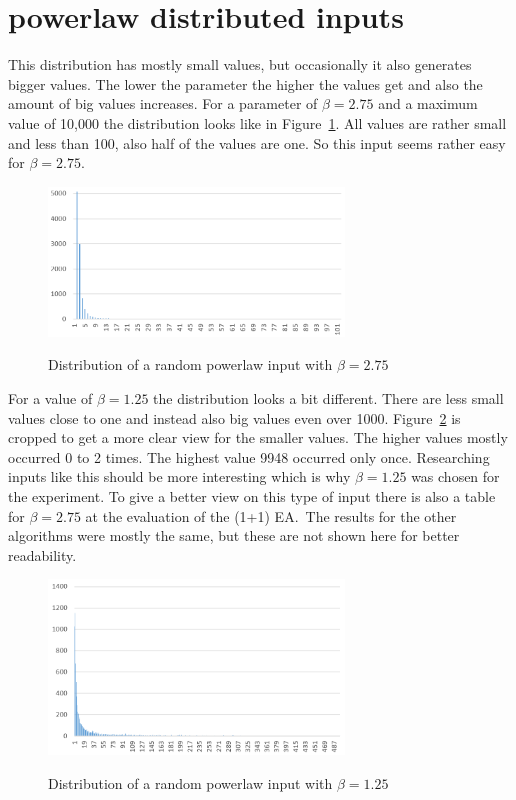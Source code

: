 \section{powerlaw distributed inputs}
This distribution has mostly small values, but occasionally it also generates bigger values.
The lower the parameter the higher the values get and also the amount of big values increases.
For a parameter of $\beta=2.75$ and a maximum value of 10,000 the distribution looks like in Figure~\ref{fig:powerDistExample1}.
All values are rather small and less than 100, also half of the values are one.
So this input seems rather easy for $\beta=2.75$.

\begin{figure}[h]
      \caption{Distribution of a random powerlaw input with $\beta=2.75$}
      \centering
      \includegraphics[width=0.7\textwidth]{figures/images/numberGenerator/powerlaw_-2_75.png}\label{fig:powerDistExample1}
\end{figure}

For a value of $\beta=1.25$ the distribution looks a bit different.
There are less small values close to one and instead also big values even over 1000.
Figure~\ref{fig:powerDistExample2} is cropped to get a more clear view for the smaller values.
The higher values mostly occurred 0 to 2 times.
The highest value 9948 occurred only once.
Researching inputs like this should be more interesting which is why $\beta=1.25$ was chosen for the experiment.
To give a better view on this type of input there is also a table for $\beta=2.75$ at the evaluation of the (1+1) EA.\
The results for the other algorithms were mostly the same, but these are not shown here for better readability.

\begin{figure}[h]
      \caption{Distribution of a random powerlaw input with $\beta=1.25$}
      \centering
      \includegraphics[width=0.7\textwidth]{figures/images/numberGenerator/powerlaw_-1_25.png}\label{fig:powerDistExample2}
\end{figure}
